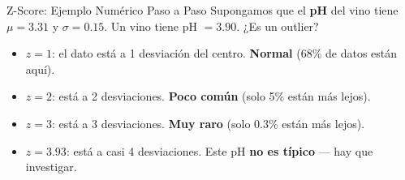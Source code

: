 \documentclass[aspectratio=169, 11pt]{beamer}
\begin{document}
\begin{frame}[shrink=10]{Z-Score: Ejemplo Numérico Paso a Paso}
  \vspace{-4pt}
  {\footnotesize
    Supongamos que el \textbf{pH} del vino tiene $\mu = 3.31$ y $\sigma = 0.15$.
    Un vino tiene pH $= 3.90$. ¿Es un outlier?}

  \vspace{6pt}
  \begin{center}
  \end{center}

  \vspace{6pt}
  {\scriptsize
  \begin{itemize}\setlength{\itemsep}{4pt}
    \item[{\color{codeBlue}\scriptsize\faArrowRight}]
      $z = 1$: el dato está a 1 desviación del centro. \textbf{Normal} (68\% de datos están aquí).
    \item[{\color{codeOrange}\scriptsize\faArrowRight}]
      $z = 2$: está a 2 desviaciones. \textbf{Poco común} (solo 5\% están más lejos).
    \item[{\color{arcaRed}\scriptsize\faArrowRight}]
      $z = 3$: está a 3 desviaciones. \textbf{Muy raro} (solo 0.3\% están más lejos).
    \item[{\color{arcaRed}\scriptsize\faExclamationTriangle}]
      $z = 3.93$: está a casi 4 desviaciones. Este pH \textbf{no es típico} --- hay que investigar.
  \end{itemize}
  }
\end{frame}
\end{document}
